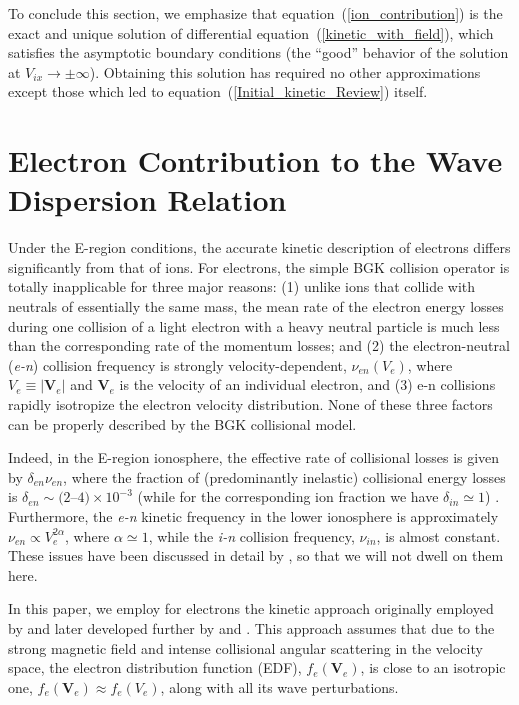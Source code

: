 \documentclass[draft]{agujournal2019}
\renewcommand{\vec}{\mathbf}
\begin{document}
To conclude this section, we emphasize that equation~(\ref{ion_contribution})
is the exact and unique solution of differential
equation~(\ref{kinetic_with_field}), which satisfies the asymptotic boundary
conditions (the ``good'' behavior of the
solution at $V_{ix}\rightarrow\pm\infty$). Obtaining
this solution has required no other approximations except those which led to
equation~(\ref{Initial_kinetic_Review}) itself.

\section{Electron Contribution to the Wave Dispersion
Relation\label{Electron contribution to the wave dispersion relation}}

Under the E-region conditions, the accurate kinetic description of electrons differs 
significantly from that of ions. For electrons, the simple BGK collision operator
is totally inapplicable for three major reasons: (1) unlike ions that collide with
neutrals of essentially the same mass, the mean rate of the electron energy
losses during one collision of a light electron with a heavy neutral particle
is much less than the corresponding rate of the momentum losses; and (2) the
electron-neutral (\emph{e-n}) collision frequency is strongly
velocity-dependent, $\nu_{en}(V_{e})$, where $V_{e}\equiv|\vec{V}_{e}|$ and
$\vec{V}_{e}$ is the velocity of an individual electron, and (3) e-n collisions 
rapidly isotropize the electron velocity distribution. None of these three factors can be properly described by the BGK
collisional model.

Indeed, in the E-region ionosphere, the effective rate of collisional losses
is given by $\delta_{en}\nu_{en}$, where the fraction of (predominantly
inelastic) collisional energy losses is $\delta_{en}\sim(2$--$4)\times10^{-3}$
(while for the corresponding ion fraction we have $\delta_{in}\simeq1$)
\cite{Gurevich:Nonlinear78}. Furthermore, the \emph{e-n} kinetic frequency in
the lower ionosphere is approximately $\nu_{en}\propto V_{e}^{2\alpha}$, where
$\alpha\simeq1$, while the \emph{i-n} collision frequency, $\nu_{in}$, is
almost constant. These issues have been discussed in detail by
, so that we will not
dwell on them here.

In this paper, we employ for electrons the kinetic approach originally
employed by  and later developed further by
 and . This approach assumes that due to
the strong magnetic field and intense collisional angular scattering in the
velocity space, the electron distribution function (EDF), $f_{e}(\vec{V}_{e})$,
is close to an isotropic one, $f_{e}(\vec{V}_{e})\approx f_{e}(V_{e})$,
along with all its wave perturbations. 
\end{document}
